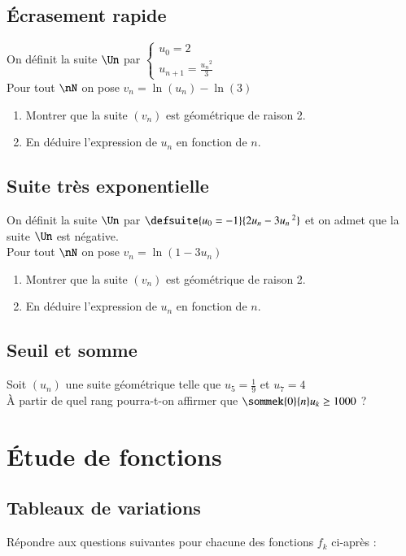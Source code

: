 \documentclass[oneside,12pt]{article}          %
\begin{document}
\subsection{Écrasement rapide}
On définit la suite $\Un$ par $\begin{cases}u_0=2 \\ u_{n+1}=\frac{{u_n}^2}{3}\end{cases}$ \\
Pour tout $\nN$ on pose $v_n=\ln(u_n)-\ln(3)$
\begin{enumerate}
	\item Montrer que la suite $(v_n)$ est géométrique de raison 2.
	\item En déduire l'expression de $u_n$ en fonction de $n$.
\end{enumerate}



\subsection{Suite très exponentielle}
On définit la suite $\Un$ par $\defsuite{u_0=-1}{2u_n-3u_n\,^2}$ et on admet que la suite $\Un$ est négative. \\
Pour tout $\nN$ on pose $v_n=\ln(1-3u_n)$
\begin{enumerate}
	\item Montrer que la suite $(v_n)$ est géométrique de raison 2.
	\item En déduire l'expression de $u_n$ en fonction de $n$.
\end{enumerate}



\subsection{Seuil et somme}
Soit $(u_n)$ une suite géométrique telle que $u_5=\frac{1}{9}$ et $u_7=4$\\
À partir de quel rang pourra-t-on affirmer que $\sommek{0}{n}u_k \geq 1000$ ?



\section{Étude de fonctions}

\subsection{Tableaux de variations}
Répondre aux questions suivantes pour chacune des fonctions $f_k$ ci-après :
\end{document}
